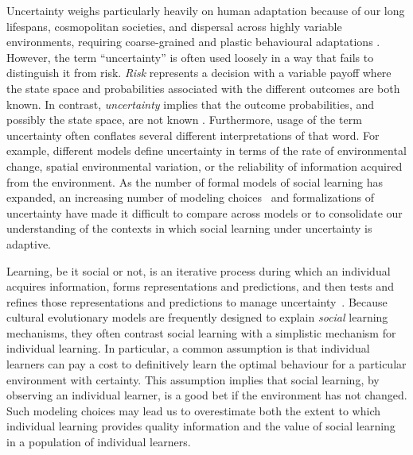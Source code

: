 \documentclass[letterpaper,11.5pt]{scrartcl}
\begin{document}
Uncertainty weighs particularly heavily on human adaptation because of
our long lifespans, cosmopolitan societies, and dispersal across highly variable environments, requiring coarse-grained and plastic behavioural adaptations \citep{levins1962}. However, the term ``uncertainty'' is often used loosely in a way that fails to distinguish it from risk. \emph{Risk} represents a decision with a variable payoff where the state space and probabilities associated with the different outcomes are both known. In contrast, \emph{uncertainty} implies that the outcome probabilities, and possibly the state space, are not known \citep{knight1921, keynes1921}. Furthermore, usage of the term uncertainty often conflates several different interpretations of that word. For example, different models define uncertainty in terms of the rate of environmental change, spatial environmental variation, or the reliability of information acquired from the environment. %
As the number of formal models of social learning has expanded, an increasing number of modeling choices~\citep{Kendal2018} and formalizations of
uncertainty have made it difficult to compare across models or to consolidate our
understanding of the contexts in which social learning under uncertainty is adaptive. 

Learning, be it social or not, is an iterative process during which an individual acquires information, forms representations and predictions, and then tests and refines those representations and predictions to manage uncertainty~\citep{jacobs2011bayesian,clark2013whatever}. Because cultural evolutionary models are frequently designed to explain \emph{social} learning mechanisms, they often contrast social learning with a simplistic mechanism for individual learning. In particular, a common assumption is that individual learners can pay a cost to definitively learn the optimal behaviour for a particular environment with certainty. This assumption implies that social learning, by observing an individual learner, is a good bet if the environment has not changed. Such modeling choices may lead us to overestimate both the extent to which individual learning provides quality information and the value of social learning in a population of individual learners. %
\end{document}
